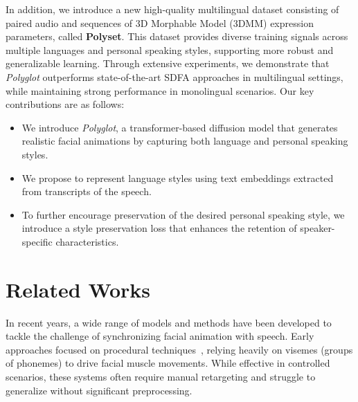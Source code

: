 \documentclass[a4paper, 10pt, conference]{ieeeconf}      %
\begin{document}
In addition, we introduce a new high-quality multilingual dataset consisting of paired audio and sequences of 3D Morphable Model (3DMM) expression parameters, called \textbf{Polyset}. This dataset provides diverse training signals across multiple languages and personal speaking styles, supporting more robust and generalizable learning. Through extensive experiments, we demonstrate that \textit{Polyglot} outperforms state-of-the-art SDFA approaches in multilingual settings, while maintaining strong performance in monolingual scenarios.
Our key contributions are as follows:
\begin{itemize}
    \item We introduce \textit{Polyglot}, a transformer-based diffusion model that generates realistic facial animations by capturing both language and personal speaking styles.
    \item We propose to represent language styles using text embeddings extracted from transcripts of the speech. 
    \item To further encourage preservation of the desired personal speaking style, we introduce a style preservation loss that enhances the retention of speaker-specific characteristics.
\end{itemize}

\section{Related Works}
\label{sec:related}
In recent years, a wide range of models and methods have been developed to tackle the challenge of synchronizing facial animation with speech. Early approaches focused on procedural techniques~\cite{JALI_2016, dominance_Massaro_procedural_2001, Cosi_procedural_2002, Wang_2007_Rulebased_coarticulation_procedural, Xu_2013_diphone_coarticulation_procedural}, relying heavily on visemes (groups of phonemes) to drive facial muscle movements. While effective in controlled scenarios, these systems often require manual retargeting and struggle to generalize without significant preprocessing.
\end{document}
